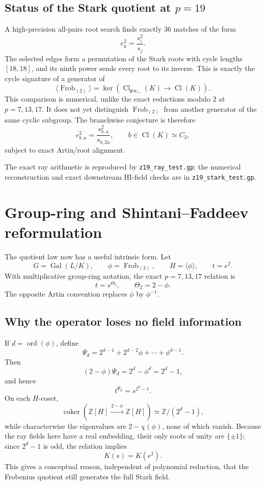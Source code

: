 \documentclass[11pt,reqno]{amsart}
\theoremstyle{plain}
\begin{document}
\subsection{\texorpdfstring{Status of the Stark quotient at \(p=19\)}{Status of the Stark quotient at p=19}}\label{sec:26.3}

A high-precision all-pairs root search finds exactly \(36\) matches of the form
\[
e_k^2=\frac{s_i^2}{s_j}.
\]
The selected edges form a permutation of the Stark roots with cycle lengths \([18,18]\), and its ninth power sends every root to its inverse. This is exactly the cycle signature of a generator of
\[
\langle\operatorname{Frob}_{(2)}\rangle
=\ker\!\left(\operatorname{Cl}_{\mathfrak p\infty_+}(K)\to\operatorname{Cl}(K)\right).
\]
This comparison is numerical, unlike the exact reductions modulo \(2\) at \(p=7,13,17\). It does not yet distinguish \(\operatorname{Frob}_{(2)}\) from another generator of the same cyclic subgroup. The branchwise conjecture is therefore
\[
\boxed{
e_{b,u}^2
=\frac{s_{b,u}^2}{s_{b,2u}},
\qquad
b\in\operatorname{Cl}(K)\simeq C_2,
}
\]
subject to exact Artin/root alignment.

The exact ray arithmetic is reproduced by \texttt{z19\_\allowbreak ray\_\allowbreak test.gp}; the numerical reconstruction and exact downstream HI-field checks are in \texttt{z19\_\allowbreak stark\_\allowbreak test.gp}.

\section{Group-ring and Shintani--Faddeev reformulation}\label{sec:27}

The quotient law now has a useful intrinsic form. Let
\[
G=\operatorname{Gal}(L/K),
\qquad
\phi=\operatorname{Frob}_{(2)},
\qquad
H=\langle\phi\rangle,
\qquad
t=e^2.
\]
With multiplicative group-ring notation, the exact \(p=7,13,17\) relation is
\[
\boxed{
t=s^{\Theta_2},
\qquad
\Theta_2=2-\phi.
}
\]
The opposite Artin convention replaces \(\phi\) by \(\phi^{-1}\).

\subsection{Why the operator loses no field information}\label{sec:27.1}

If \(d=\operatorname{ord}(\phi)\), define
\[
\Psi_d=2^{d-1}+2^{d-2}\phi+\cdots+\phi^{d-1}.
\]
Then
\[
(2-\phi)\Psi_d=2^d-\phi^d=2^d-1,
\]
and hence
\[
t^{\Psi_d}=s^{2^d-1}.
\]
On each \(H\)-coset,
\[
\operatorname{coker}\!\left(
\mathbb Z[H]\xrightarrow{\,2-\phi\,}\mathbb Z[H]
\right)
\simeq \mathbb Z/(2^d-1),
\]
while characterwise the eigenvalues are \(2-\chi(\phi)\), none of which vanish. Because the ray fields here have a real embedding, their only roots of unity are \(\{\pm1\}\); since \(2^d-1\) is odd, the relation implies
\[
K(s)=K(e^2).
\]
This gives a conceptual reason, independent of polynomial reduction, that the Frobenius quotient still generates the full Stark field.
\end{document}
